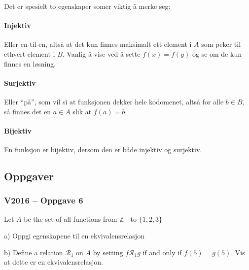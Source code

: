Det er spesielt to egenskaper somer viktig å merke seg:

\paragraph*{Injektiv} Eller en-til-en, altså at det kun finnes maksimalt ett element i $A$ som peker til ethvert element i $B$. Vanlig å vise ved å sette $f(x)=f(y)$ og se om de kun finnes en løsning.
\paragraph*{Surjektiv} Eller \enquote{på}, som vil si at funksjonen dekker hele kodomenet, altså for alle $b\in B$, så finnes det en $a\in A$ slik at $f(a)=b$
\paragraph*{Bijektiv} En funksjon er bijektiv, dersom den er både injektiv og surjektiv.


\subsection{Oppgaver}

\subsubsection{V2016 – Oppgave 6}
Let $A$ be the set of all functions from $\mathbb{Z}_+$ to $\{1,2,3\}$

a) Oppgi egenskapene til en ekvivalensrelasjon

b) Define a relation $\mathcal{R}_1$ on $A$ by setting $f\mathcal{R}_1 g$ if and only if $f(5)=g(5)$. Vis at dette er en ekvivalensrelasjon.

